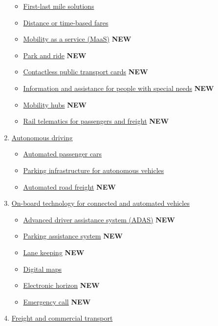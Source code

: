\documentclass[
]{book}
\providecommand{\tightlist}{%
  \setlength{\itemsep}{0pt}\setlength{\parskip}{0pt}}
\begin{document}
\begin{enumerate}
  \begin{itemize}
  \tightlist
  \item
    \protect\hyperlink{flms}{First-last mile solutions}
  \item
    \protect\hyperlink{dist_time_fares}{Distance or time-based fares}
  \item
    \protect\hyperlink{maas}{Mobility as a service (MaaS)} \textbf{NEW}
  \item
    \protect\hyperlink{p_r}{Park and ride} \textbf{NEW}
  \item
    \protect\hyperlink{contactless_cards}{Contactless public transport cards} \textbf{NEW}
  \item
    \protect\hyperlink{special_needs}{Information and assistance for people with special needs} \textbf{NEW}
  \item
    \protect\hyperlink{mobility_hubs}{Mobility hubs} \textbf{NEW}
  \item
    \protect\hyperlink{rail_telematics}{Rail telematics for passengers and freight} \textbf{NEW}
  \end{itemize}
\item
  \protect\hyperlink{connected}{Autonomous driving}

  \begin{itemize}
  \tightlist
  \item
    \protect\hyperlink{av}{Automated passenger cars}
  \item
    \protect\hyperlink{parking_av}{Parking infrastructure for autonomous vehicles}
  \item
    \protect\hyperlink{automated_road_freight}{Automated road freight} \textbf{NEW}
  \end{itemize}
\item
  \protect\hyperlink{onboard}{On-board technology for connected and automated vehicles}

  \begin{itemize}
  \tightlist
  \item
    \protect\hyperlink{adas}{Advanced driver assistance system (ADAS)} \textbf{NEW}
  \item
    \protect\hyperlink{parking_assistance}{Parking assistance system} \textbf{NEW}
  \item
    \protect\hyperlink{lane_keeping}{Lane keeping} \textbf{NEW}
  \item
    \protect\hyperlink{digital_maps}{Digital maps}
  \item
    \protect\hyperlink{ehorizon}{Electronic horizon} \textbf{NEW}
  \item
    \protect\hyperlink{ecall}{Emergency call} \textbf{NEW}
  \end{itemize}
\item
  \protect\hyperlink{freight}{Freight and commercial transport}


\end{enumerate}
\end{document}
